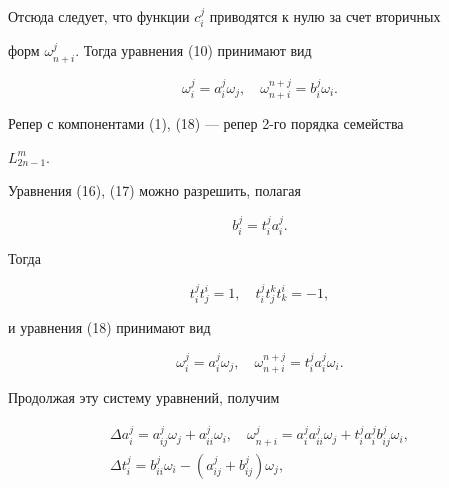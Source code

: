 Отсюда следует, что функции $c^j_i$ приводятся к нулю за счет вторичных 


форм $\omega^j_{n+i}$. Тогда уравнения (10) принимают вид 


\begin{equation} 


\omega^j_i=a^j_i\omega_j,\quad 


\omega^{n+j}_{n+i}=b^j_i \omega_i. 


\end{equation} 


Репер с компонентами (1), (18) --- репер 2-го порядка семейства 


$L^m_{2n-1}$. 


 


Уравнения (16), (17) можно разрешить, полагая 


\begin{equation} 


b^j_i=t^j_i a^j_i. \tag{18$_\alpha$} 


\end{equation} 


Тогда 


\begin{equation} 


t^j_i t^i_j=1,\quad t^j_i t^k_j t^i_k=-1, 


\end{equation} 


и уравнения (18) принимают вид 


\begin{equation} 


\omega^j_i=a^j_i\omega_j,\quad 


\omega^{n+j}_{n+i}=t^j_i a^j_i\omega_i. 


\end{equation} 


Продолжая эту систему уравнений, получим 


\begin{equation} 


\begin{array}{c} 


\Delta a^j_i=a^j_{ij}\omega_j+a^j_{ii}\omega_i,\quad 


\omega^j_{n+i}=a^j_i a^j_{ii}\omega_j+ 


t^j_i a^j_i b^j_{ij}\omega_i, \\[2mm] 


\Delta t^j_i=b^j_{ii}\omega_i-(a^j_{ij}+b^j_{ij})\omega_j, 


\end{array} 


\end{equation} 


